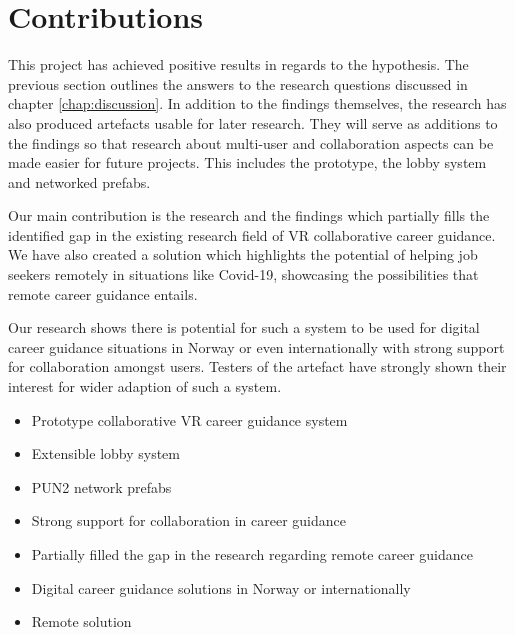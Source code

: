 

    
    
        



\section{Contributions}

This project has achieved positive results in regards to the hypothesis. The previous section outlines the answers to the research questions discussed in chapter \ref{chap:discussion}. In addition to the findings themselves, the research has also produced artefacts usable for later research. They will serve as additions to the findings so that research about multi-user and collaboration aspects can be made easier for future projects. This includes the prototype, the lobby system and networked prefabs.  
  
Our main contribution is the research and the findings which partially fills the identified gap in the existing research field of VR collaborative career guidance. We have also created a solution which highlights the potential of helping job seekers remotely in situations like Covid-19, showcasing the possibilities that remote career guidance entails. 

Our research shows there is potential for such a system to be used for digital career guidance situations in Norway or even internationally with strong support for collaboration amongst users. Testers of the artefact have strongly shown their interest for wider adaption of such a system.


\begin{itemize}
    \item Prototype collaborative VR career guidance system
    \item Extensible lobby system
    \item PUN2 network prefabs
    \item Strong support for collaboration in career guidance
    \item Partially filled the gap in the research regarding remote career guidance
    \item Digital career guidance solutions in Norway or internationally 
    \item Remote solution
\end{itemize}    




